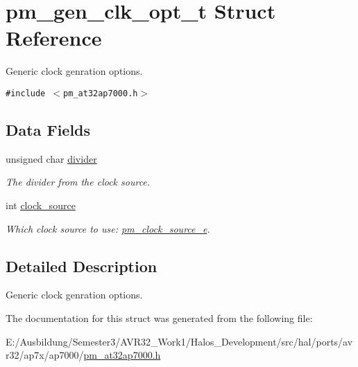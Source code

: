 \hypertarget{structpm__gen__clk__opt__t}{
\section{pm\_\-gen\_\-clk\_\-opt\_\-t Struct Reference}
\label{structpm__gen__clk__opt__t}
}
Generic clock genration options.  


{\tt \#include $<$pm\_\-at32ap7000.h$>$}

\subsection*{Data Fields}
\begin{CompactItemize}
\item 
\hypertarget{structpm__gen__clk__opt__t_e495c8ca4f93880050fd933007e01dd8}{
unsigned char \hyperlink{structpm__gen__clk__opt__t_e495c8ca4f93880050fd933007e01dd8}{divider}}
\label{structpm__gen__clk__opt__t_e495c8ca4f93880050fd933007e01dd8}

\begin{CompactList}\small\item\em The divider from the clock source. \item\end{CompactList}\item 
\hypertarget{structpm__gen__clk__opt__t_d3a47091ba56f4c0181a49f871ba1f1f}{
int \hyperlink{structpm__gen__clk__opt__t_d3a47091ba56f4c0181a49f871ba1f1f}{clock\_\-source}}
\label{structpm__gen__clk__opt__t_d3a47091ba56f4c0181a49f871ba1f1f}

\begin{CompactList}\small\item\em Which clock source to use: \hyperlink{pm__at32ap7000_8h_e3792d2f861d39eed0dd8a82ec76346e}{pm\_\-clock\_\-source\_\-e}. \item\end{CompactList}\end{CompactItemize}


\subsection{Detailed Description}
Generic clock genration options. 

The documentation for this struct was generated from the following file:\begin{CompactItemize}
\item 
E:/Ausbildung/Semester3/AVR32\_\-Work1/Halos\_\-Development/src/hal/ports/avr32/ap7x/ap7000/\hyperlink{pm__at32ap7000_8h}{pm\_\-at32ap7000.h}\end{CompactItemize}
